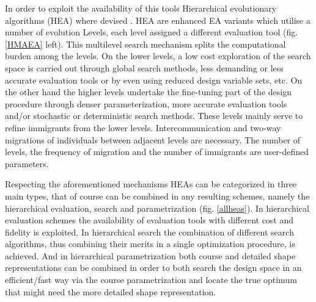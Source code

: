 In order to exploit the availability of this tools Hierarchical evolutionary algorithms (HEA) where devised \cite{Herr1999, Sefr2000, Desid2003, LTT_2_031, LTT_3_092, LTT_2_036,
LTT_2_044, LTT_2_048, LTT_4_05}. HEA are enhanced EA variants which utilise a number of evolution Levels, each level assigned a different evaluation tool (fig.\ref{HMAEA} left). This multilevel search mechanism splits the computational burden among the levels. On the lower levels, a low cost exploration of the search space is carried out through global search methods, less demanding or less accurate evaluation tools or by even using reduced design variable sets, etc. On the other hand the higher levels undertake the fine-tuning part of the design procedure through denser parameterization, more accurate evaluation tools and/or stochastic or deterministic search methods. These levels mainly serve to refine immigrants from the lower levels. Intercommunication and two-way migrations of individuals between adjacent levels are necessary. The number of levels, the frequency of migration and the number of immigrants are user-defined parameters.

Respecting the aforementioned mechanisms HEAs can be categorized in three main types, that of course can be combined in any resulting schemes, namely the hierarchical evaluation,  search and parametrization (fig. \ref{allheas}). In hierarchical evaluation schemes the availability of evaluation tools with different cost and fidelity is exploited. In hierarchical search the combination of different search algorithms, thus combining their merits in a single optimization procedure, is achieved. And in hierarchical parametrization both course and detailed shape representations can be combined in order to both search the design space in an efficient/fast way via the course parametrization and locate the true optimum that might need the more detailed shape representation. 

